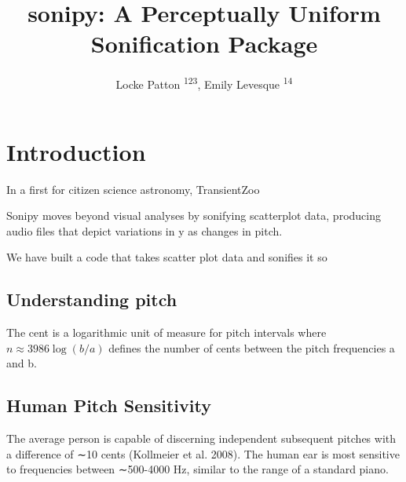 \documentclass[]{acmsiggraph}
\title{sonipy: A Perceptually Uniform Sonification Package}
\author{Locke Patton \textsuperscript{123}, Emily Levesque \textsuperscript{14}}
\begin{document}

\maketitle




\section{Introduction} \label{sec:introduction}

In a first for citizen science astronomy, TransientZoo 


Sonipy moves beyond visual analyses by sonifying scatterplot data, producing audio files that depict variations in y as changes in pitch.


We have built a code that takes scatter plot data and sonifies it so

\subsection{Understanding pitch}
The cent is a logarithmic unit of measure for pitch intervals where $n \approx 3986\log(b/a)$ defines the number of cents between the pitch frequencies a and b.

\subsection{Human Pitch Sensitivity}
The average person is capable of discerning independent subsequent pitches with a difference of ∼10 cents (Kollmeier et al. 2008). The human ear is most sensitive to frequencies between ∼500-4000 Hz, similar to the range of a standard piano.
\end{document}
